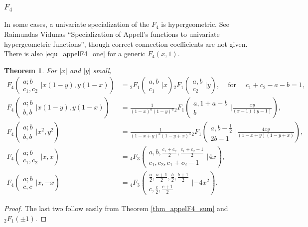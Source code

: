 \documentclass[12pt]{article}
\numberwithin{equation}{section}
\newtheorem{theorem}{Theorem}[section]
\newcommand{\Head}[3] {{}_{#1}{#2}_{#3}}
\newcommand{\ArgS}[3] {( \begin{smallmatrix} #1 \\ #2 \end{smallmatrix} | {#3})}
\newcommand{\appellFfourS}[6]    {F_4 \ArgS{{#1};{#2}}{{#3},{#4}}{{#5},{#6}}}
\begin{document}
\subsubsection{$F_4$}

In some cases, a univariate specialization of the $F_4$ is hypergeometric. See Raimundas Vidunas ``Specialization of Appell's functions to univariate hypergeometric functions'', though correct connection coefficients are not given. There is also \eqref{equ_appelF4_one} for a generic $F_4(x,1)$.
\begin{theorem}
\label{thm_f4_reduce}
For $|x|$ and $|y|$ small,
\begin{align*}
\appellFfourS{a}{b}{c_1}{c_2}{x(1-y)}{y(1-x)} &= \Head{2}{F}{1}\ArgS{a,b}{c_1}{x} \Head{2}{F}{1}\ArgS{a,b}{c_2}{y}\text{,} \quad \text{ for } \quad c_1+c_2-a-b = 1\text{,}\\
\appellFfourS{a}{b}{b}{b}{x(1-y)}{y(1-x)} &= \tfrac{1}{(1-x)^{a}(1-y)^{a}} \Head{2}{F}{1}\ArgS{a,1+a-b}{b}{\tfrac{x y}{(x-1)(y-1)}}\text{,}\\
\appellFfourS{a}{b}{b}{b}{x^2}{y^2} &= \tfrac{1}{(1-x+y)^{a}(1-y+x)^{a}} \Head{2}{F}{1}\ArgS{a,b-\frac12}{2b-1}{\tfrac{4 x y}{(1-x+y) (1-y+x)}}\text{,}\\
\appellFfourS{a}{b}{c_1}{c_2}{x}{x} &= \Head{4}{F}{3}\ArgS{a,b,\frac{c_1+c_2}{2},\frac{c_1+c_2-1}{2}}{c_1,c_2,c_1+c_2-1}{4x}\text{,}\\
\appellFfourS{a}{b}{c}{c}{x}{-x} &= \Head{4}{F}{3}\ArgS{\frac{a}{2},\frac{a+1}{2},\frac{b}{2},\frac{b+1}{2}}{c,\frac{c}{2},\frac{c+1}{2}}{-4x^2}\text{.}
\end{align*}
\end{theorem}
\begin{proof}
The last two follow easily from Theorem \ref{thm_appelF4_sum} and $\Head2F1(\pm1)$.
\end{proof}
\end{document}
